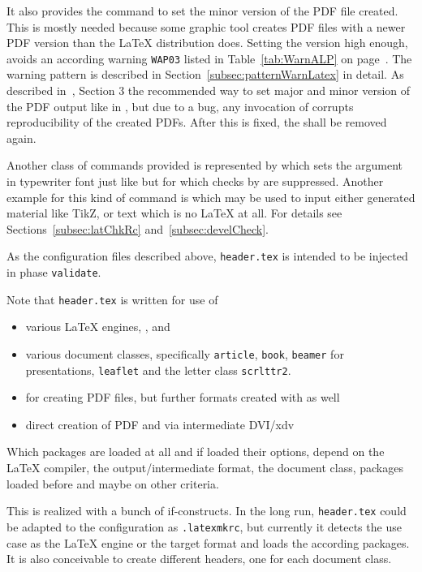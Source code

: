 It also provides the command  to set the minor version of the PDF file created. 
This is mostly needed because some graphic tool creates PDF files with a newer PDF version 
than the \LaTeX{} distribution does. 
Setting the version high enough, avoids an according warning \texttt{WAP03} 
listed in Table~\ref{tab:WarnALP} on page~\pageref{tab:WarnALP}. 
The warning pattern is described in Section~\ref{subsec:patternWarnLatex} in detail. 
As described in~\cite{DocMetaDataSuppCode25}, Section 3 
the recommended way to set major and minor version of the PDF output 
like in , 
but due to a bug, any invocation of  
corrupts reproducibility of the created PDFs. 
After this is fixed, the  shall be removed again. 

Another class of commands provided is represented by  
which sets the argument in typewriter font 
just like  but for which checks by  are suppressed. 
Another example for this kind of command is  
which may be used to input either generated material like TikZ,
or text which is no \LaTeX{} at all. 
For details see Sections~\ref{subsec:latChkRc} and~\ref{subsec:develCheck}. 
\medskip


As the configuration files described above, 
\texttt{header.tex} is intended to be injected in phase \texttt{validate}. 

Note that \texttt{header.tex} is written for use of 
%
\begin{itemize}
  \item various \LaTeX{} engines, \lualatex, \xelatex{} and \pdflatex{} 
  \item various document classes, 
  specifically \texttt{article}, \texttt{book}, \texttt{beamer} for presentations, 
  \texttt{leaflet} and the letter class \texttt{scrlttr2}. 
  \item for creating PDF files, but further formats created with  as well
  \item direct creation of PDF and via intermediate DVI/\gls{xdv} 
\end{itemize}

Which packages are loaded at all and if loaded their options, 
depend on the \LaTeX{} compiler, the output/intermediate format, 
the document class, packages loaded before and maybe on other criteria. 

This is realized with a bunch of if-constructs. 
In the long run, \texttt{header.tex} could be adapted 
to the configuration as \texttt{.latexmkrc}, 
but currently it detects the use case 
as the \LaTeX{} engine or the target format 
and loads the according packages. 
It is also conceivable to create different headers, one for each document class. 


